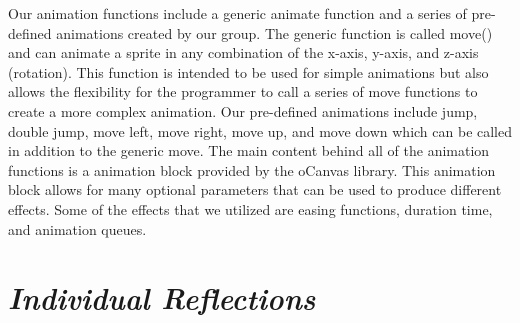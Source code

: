 \documentclass[12pt]{article}
\begin{document}
 \newpage
Our animation functions include a generic animate function and a series of pre-defined animations created by our group. The generic function is called move() and can animate a sprite in any combination of the x-axis, y-axis, and z-axis (rotation). This function is intended to be used for simple animations but also allows the flexibility for the programmer to call a series of move functions to create a more complex animation. Our pre-defined animations include jump, double jump, move left, move right, move up, and move down which can be called in addition to the generic move. The main content behind all of the animation functions is a animation block provided by the oCanvas library. This animation block allows for many optional parameters that can be used to produce different effects. Some of the effects that we utilized are easing functions, duration time, and animation queues. \\ 

\section{\emph{Individual Reflections}}
\end{document}
